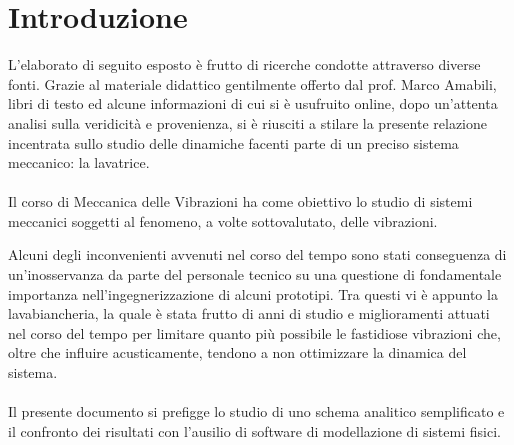 \section{Introduzione}
L’elaborato di seguito esposto è frutto di ricerche condotte attraverso diverse fonti. 
Grazie al materiale didattico gentilmente offerto dal prof. Marco Amabili, libri di testo ed alcune informazioni di cui si è usufruito online, dopo un’attenta analisi sulla veridicità e provenienza, si è riusciti a stilare la presente relazione incentrata sullo studio delle dinamiche facenti parte di un preciso sistema meccanico: la lavatrice.
\\
\\
Il corso di Meccanica delle Vibrazioni ha come obiettivo lo studio di sistemi meccanici soggetti al fenomeno, a volte sottovalutato, delle vibrazioni.

Alcuni degli inconvenienti avvenuti nel corso del tempo sono stati conseguenza di un’inosservanza da parte del personale tecnico su una questione di fondamentale importanza nell’ingegnerizzazione di alcuni prototipi.
Tra questi vi è appunto la lavabiancheria, la quale è stata frutto di anni di studio e miglioramenti attuati nel corso del tempo per limitare quanto più possibile le fastidiose vibrazioni che, oltre che influire acusticamente, tendono a non ottimizzare la dinamica del sistema.
\\
\\
Il presente documento si prefigge lo studio di uno schema analitico semplificato e il confronto dei risultati con l'ausilio di software di modellazione di sistemi fisici. 

